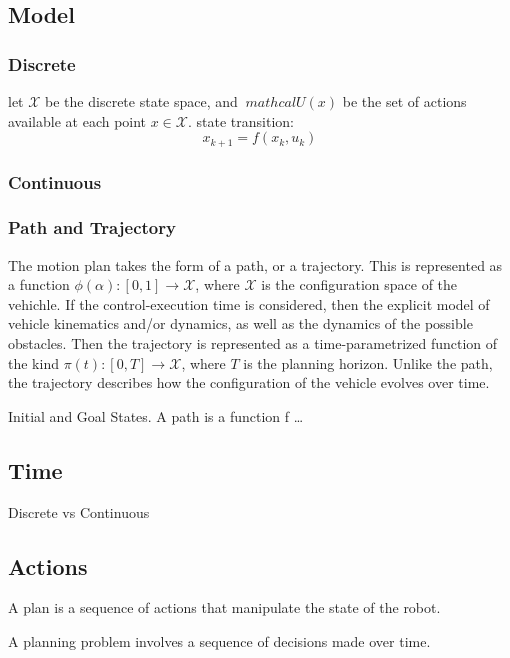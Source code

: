 \subsection{Model}

\subsubsection{Discrete}
let \(\mathcal{X}\) be the discrete state space, and \(\ mathcal{U}(x)\) be the
set of actions available at each point \(x \in \mathcal{X}\). state transition:
\[
  x_{k+1} = f(x_k, u_k)
\]

\subsubsection{Continuous}

\subsubsection{Path and Trajectory}

The motion plan takes the form of a path, or a trajectory. This is represented
as a function \(\phi(\alpha) \colon [0,1] \rightarrow \mathcal{X}\), where
\(\mathcal{X}\) is the configuration space of the vehichle. If the
control-execution time is considered, then the explicit model of vehicle
kinematics and/or dynamics, as well as the dynamics of the possible obstacles.
Then the trajectory is represented as a time-parametrized function of the kind
\(\pi(t) \colon [0,T] \rightarrow \mathcal{X}\), where \(T\) is the planning
horizon. Unlike the path, the trajectory describes how the configuration of the
vehicle evolves over time.

Initial and Goal States. A path is a function f \ldots

\subsection{Time}
\label{subsec:Time}

Discrete vs Continuous

\subsection{Actions}
\label{subsec:Actions}

A plan is a sequence of actions that manipulate the state of the robot.

A planning problem involves a sequence of decisions made over time.


